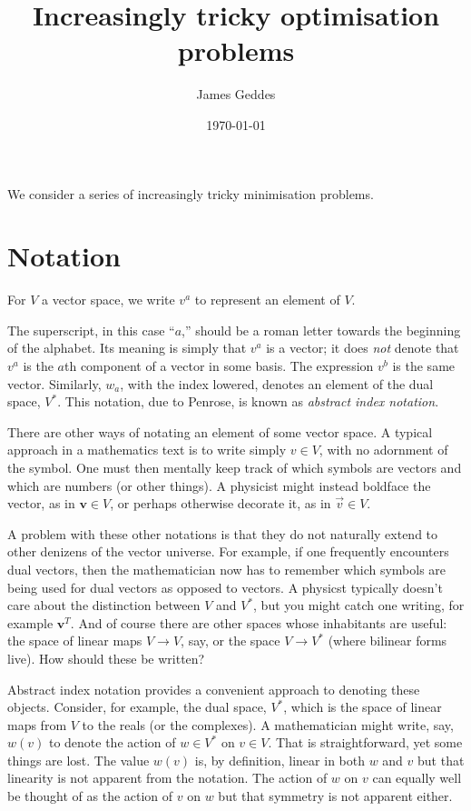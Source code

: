 \documentclass[10pt, a4paper]{article}
\title{Increasingly tricky optimisation problems}
\author{James Geddes}
\date{\today}
\begin{document}
\maketitle

We consider a series of increasingly tricky minimisation problems. 

\section*{Notation}

For $V$ a vector space, we write $v^a$ to represent an element of
$V$.

The superscript, in this case “$a$,” should be a roman letter towards
the beginning of the alphabet. Its meaning is simply that $v^a$ is a
vector; it does \emph{not} denote that $v^a$ is the $a$th component of a
vector in some basis. The expression $v^b$ is the same
vector. Similarly, $w_a$, with the index lowered, denotes an element
of the dual space, $V^*$. This notation, due to Penrose, is known as
\emph{abstract index notation}.

There are other ways of notating an element of some vector space. A
typical approach in a mathematics text is to write simply $v\in V$, with
no adornment of the symbol. One must then mentally keep track of which
symbols are vectors and which are numbers (or other things). A
physicist might instead boldface the vector, as in
$\mathbold{v}\in V$, or perhaps otherwise decorate it, as in
$\vec{v}\in V$.

A problem with these other notations is that they do not naturally
extend to other denizens of the vector universe. For example, if one
frequently encounters dual vectors, then the mathematician now has to
remember which symbols are being used for dual vectors as opposed to
vectors. A physicst typically doesn't care about the distinction
between $V$ and $V^*$, but you might catch one writing, for example
$\mathbold{v}^T$. 
And of course there are other spaces whose inhabitants are useful: the
space of linear maps $V\to V$, say, or the space $V\to V^*$ (where
bilinear forms live). How should these be written?

Abstract index notation provides a convenient approach to denoting
these objects. Consider, for example, the dual space, $V^*$, which is
the space of linear maps from $V$ to the reals (or the complexes). A
mathematician might write, say, $w(v)$ to denote the action of
$w\in V^*$ on $v\in V$. That is straightforward, yet some things are
lost. The value $w(v)$ is, by definition, linear in both $w$ and $v$
but that linearity is not apparent from the notation. The action of
$w$ on $v$ can equally well be thought of as the action of $v$ on $w$
but that symmetry is not apparent either.
\end{document}
